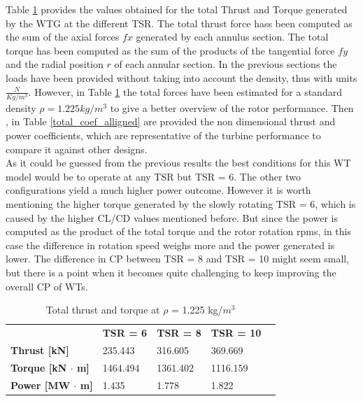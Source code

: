 Table \ref{total_forces_alligned} provides the values obtained for the total Thrust and Torque generated by the WTG at the different TSR. The total thrust force hass been computed as the sum of the axial forces $fx$ generated by each annulus section. The total torque has been computed as the sum of the products of the tangential force $fy$ and the radial position $r$ of each annular section. In the previous sections the loads have been provided without taking into account the density, thus with units $ \frac{N}{Kg/m^3} $. However, in Table \ref{total_forces_alligned} the total forces have been estimated for a standard density $\rho = 1.225 kg/m^3$ to give a better overview of the rotor performance. Then , in Table \ref{total_coef_alligned} are provided the non dimensional thrust and power coefficients, which are representative of the turbine performance to compare it against other designs. \\

As it could be guessed from the previous results the best conditions for this WT model would be to operate at any TSR but TSR = 6. The other two configurations yield a much higher power outcome. However it is worth mentioning the higher torque generated by the slowly rotating TSR = 6, which is caused by the higher CL/CD values mentioned before. But since the power is computed as the product of the total torque and the rotor rotation rpms, in this case the difference in rotation speed weighs more and the power generated is lower. The difference in CP between TSR = 8 and TSR = 10 might seem small, but there is a point when it becomes quite challenging to keep improving the overall CP of WTs.

\begin{table}[htpb]
\caption{Total thrust and torque at $\rho$ = 1.225 kg/$m^3$}
\begin{tabular}{lllll}
\cline{2-5}
\multicolumn{1}{l|}{}                            & \multicolumn{1}{l|}{\textbf{TSR = 6}} & \multicolumn{1}{l|}{\textbf{TSR = 8}} & \multicolumn{1}{l|}{\textbf{TSR = 10}} &  \\ \cline{1-4}
\multicolumn{1}{|l|}{\textbf{Thrust {[}kN{]}}}   & \multicolumn{1}{l|}{235.443}          & \multicolumn{1}{l|}{316.605}          & \multicolumn{1}{l|}{369.669}           &  \\ \cline{1-4}
\multicolumn{1}{|l|}{\textbf{Torque {[}kN $\cdot$ m{]}}} & \multicolumn{1}{l|}{1464.494}         & \multicolumn{1}{l|}{1361.402}         & \multicolumn{1}{l|}{1116.159}          &  \\ \cline{1-4}
\multicolumn{1}{|l|}{\textbf{Power {[}MW $\cdot$ m{]}}} & \multicolumn{1}{l|}{1.435}         & \multicolumn{1}{l|}{1.778}         & \multicolumn{1}{l|}{1.822}          &  \\ \cline{1-4}
\end{tabular}
\label{total_forces_alligned}
\end{table}

